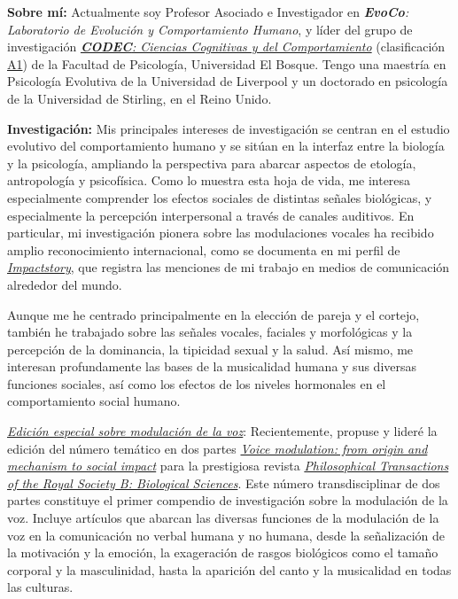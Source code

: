 \documentclass[11pt,a4paper,]{awesome-cv}
\begin{document}
\begin{footnotesize}

\textbf{Sobre mí:} Actualmente soy Profesor Asociado e Investigador en \textit{\textbf{EvoCo}: Laboratorio de Evolución y Comportamiento Humano}, y líder del grupo de investigación  \href{https://investigaciones.unbosque.edu.co/codec}{\textit{\textbf{CODEC}: Ciencias Cognitivas y del Comportamiento}} (clasificación \href{https://scienti.minciencias.gov.co/gruplac/jsp/visualiza/visualizagr.jsp?nro=00000000001446}{A1}) de la Facultad de Psicología, Universidad El Bosque. Tengo una maestría en Psicología Evolutiva de la Universidad de Liverpool y un doctorado en psicología de la Universidad de Stirling, en el Reino Unido.

\textbf{Investigación:} Mis principales intereses de investigación se centran en el estudio evolutivo del comportamiento humano y se sitúan en la interfaz entre la biología y la psicología, ampliando la perspectiva para abarcar aspectos de etología, antropología y psicofísica. Como lo muestra esta hoja de vida, me interesa especialmente comprender los efectos sociales de distintas señales biológicas, y especialmente la percepción interpersonal a través de canales auditivos. En particular, mi investigación pionera sobre las modulaciones vocales ha recibido amplio reconocimiento internacional, como se documenta en mi perfil de \href{https://profiles.impactstory.org/u/0000-0002-0092-6298}{\textit{Impactstory}}, que registra las menciones de mi trabajo en medios de comunicación alrededor del mundo.

Aunque me he centrado principalmente en la elección de pareja y el cortejo, también he trabajado sobre las señales vocales, faciales y morfológicas y la percepción de la dominancia, la tipicidad sexual y la salud. Así mismo, me interesan profundamente las bases de la musicalidad humana y sus diversas funciones sociales, así como los efectos de los niveles hormonales en el comportamiento social humano.

\underline{\textit{Edición especial sobre modulación de la voz}}: Recientemente, propuse y lideré la edición del número temático en dos partes \href{https://royalsocietypublishing.org/toc/rstb/2021/376/1840}{\textit{Voice modulation: from origin and mechanism to social impact}} para la prestigiosa revista \href{https://royalsocietypublishing.org/journal/rstb}{\textit{Philosophical Transactions of the Royal Society B: Biological Sciences}}. Este número transdisciplinar de dos partes constituye el primer compendio de investigación sobre la modulación de la voz. Incluye artículos que abarcan las diversas funciones de la modulación de la voz en la comunicación no verbal humana y no humana, desde la señalización de la motivación y la emoción, la exageración de rasgos biológicos como el tamaño corporal y la masculinidad, hasta la aparición del canto y la musicalidad en todas las culturas.


\end{footnotesize}
\end{document}
